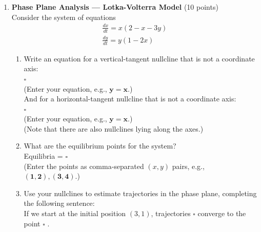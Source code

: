\begin{enumerate}
  \item \textbf{Phase Plane Analysis --- Lotka-Volterra Model} (10 points)\\
  Consider the system of equations
  $$
  \begin{gathered}
  \frac{d x}{d t}=x(2-x-3 y) \\
  \frac{d y}{d t}=y(1-2 x)
  \end{gathered}
  $$
  \begin{enumerate}[label=(\alph*)]
    \item Write an equation for a vertical-tangent nullcline that is not a coordinate axis:\\
    $\square$\\
    (Enter your equation, e.g., $\boldsymbol{y}=\boldsymbol{x}$.)\\
    And for a horizontal-tangent nullcline that is not a coordinate axis:\\
    $\square$\\
    (Enter your equation, e.g., $\boldsymbol{y}=\boldsymbol{x}$.)\\
    (Note that there are also nullclines lying along the axes.)\\
    \begin{subanswer}
    \end{subanswer}
    \item What are the equilibrium points for the system?\\
    Equilibria = $\square$\\
    (Enter the points as comma-separated $(x, y)$ pairs, e.g., $(\mathbf{1 , 2}),(\mathbf{3 , 4})$.)\\
    \begin{subanswer}
    \end{subanswer}
    \item Use your nullclines to estimate trajectories in the phase plane, completing the following sentence:\\
    If we start at the initial position $(3,1)$, trajectories $\square$ converge to the point $\square$ .\\
    \begin{subanswer}
    \end{subanswer}
  \end{enumerate}

  \newpage


\end{enumerate}
